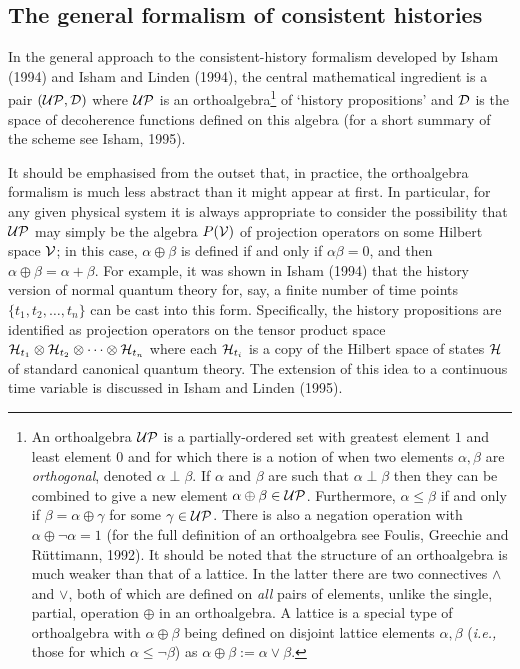 \documentclass[12pt]{article}
\newcounter{def-number}[section]
\newcommand{\ie}{{\em i.e.,\ }}
\renewcommand{\a}{\alpha}                   %
\renewcommand{\b}{\beta}                    %
\newcommand{\g}{\gamma}
\newcommand{\D}{{\cal D}}
\renewcommand{\H}{{\cal H}}
\newcommand{\UP}{{\cal UP}}
\newcommand{\V}{{\cal V}}
\begin{document}
\subsection{The general formalism of consistent histories} 
In the general approach to the consistent-history formalism
developed by Isham (1994) and Isham and Linden (1994), the central
mathematical ingredient is a pair $(\UP,\D)$ where $\UP$ is an
orthoalgebra\footnote{An orthoalgebra $\UP$ is a partially-ordered
set with greatest element $1$ and least element $0$ and for which
there is a notion of when two elements $\a,\b$ are {\em
orthogonal\/}, denoted $\a\perp\b$. If $\a$ and $\b$ are such that
$\a\perp\b$ then they can be combined to give a new element
$\a\oplus\b\in\UP$. Furthermore, $\a\leq\b$ if and only if
$\b=\a\oplus\g$ for some $\g\in\UP$. There is also a negation
operation with $\a\oplus\neg\a=1$ (for the full definition of an
orthoalgebra see Foulis, Greechie and R\"uttimann, 1992).  It should
be noted that the structure of an orthoalgebra is much weaker than
that of a lattice.  In the latter there are two connectives $\land$
and $\lor$, both of which are defined on {\em all\/} pairs of
elements, unlike the single, partial, operation $\oplus$ in an
orthoalgebra. A lattice is a special type of orthoalgebra with
$\a\oplus\b$ being defined on disjoint lattice elements $\a,\b$ (\ie
those for which $\a\leq\neg\b$) as $\a\oplus\b:=\a\lor\b$.} of
`history propositions' and $\D$ is the space of decoherence
functions defined on this algebra (for a short summary of the scheme
see Isham, 1995).

	It should be emphasised from the outset that, in practice, the
orthoalgebra formalism is much less abstract than it might appear at
first. In particular, for any given physical system it is always
appropriate to consider the possibility that $\UP$ may simply be the
algebra $P(\V)$ of projection operators on some Hilbert space $\V$;
in this case, $\a\oplus\b$ is defined if and only if $\a\b=0$, and
then $\a\oplus\b=\a+\b$.  For example, it was shown in Isham (1994)
that the history version of normal quantum theory for, say, a finite
number of time points $\{t_1,t_2,\ldots,t_n\}$ can be cast into this
form. Specifically, the history propositions are identified as
projection operators on the tensor product space
$\H_{t_1}\otimes\H_{t_2}\otimes\cdots\otimes\H_{t_n}$ where each
$\H_{t_i}$ is a copy of the Hilbert space of states $\H$ of standard
canonical quantum theory. The extension of this idea to a continuous
time variable is discussed in Isham and Linden (1995).
\end{document}
